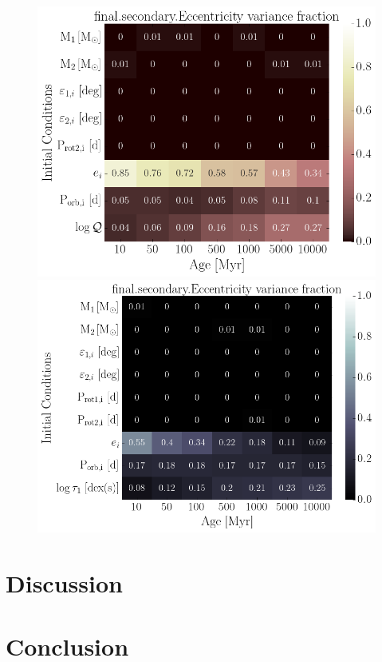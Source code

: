\documentclass[]{aastex631}
\begin{document}
\begin{figure}[ht!]
\begin{center}
	\includegraphics[width=.49\linewidth]{../figures/sensitivity_cpl_final_secondary_Eccentricity.png} 
	\includegraphics[width=.49\linewidth]{../figures/sensitivity_ctl_final_secondary_Eccentricity.png} 
\end{center}
\end{figure}

\section{Discussion} \label{sec:discusstion}



\section{Conclusion} \label{sec:conclusion}


\hfill \break %
\newpage
\appendix \label{sec:appendix}


{}

\end{document}
